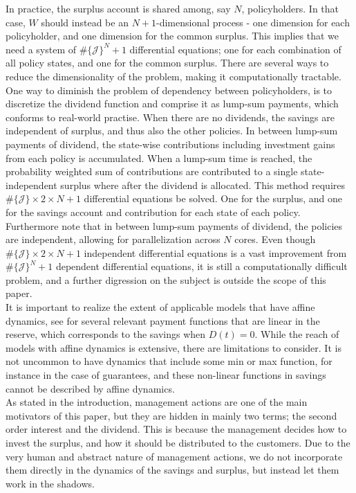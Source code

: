 \documentclass[12pt]{article}
\theoremstyle{my_thm}
\begin{document}
In practice, the surplus account is shared among, say $N$, policyholders. In that case, $W$ should instead be an $N+1$-dimensional process - one dimension for each policyholder, and one dimension for the common surplus. This implies that we need a system of $\# \{ \mathcal{J} \}^N+1$ differential equations; one for each combination of all policy states, and one for the common surplus. There are several ways to reduce the dimensionality of the problem, making it computationally tractable. One way to diminish the problem of dependency between policyholders, is to discretize the dividend function and comprise it as lump-sum payments, which conforms to real-world practise. When there are no dividends, the savings are independent of surplus, and thus also the other policies. In between lump-sum payments of dividend, the state-wise contributions including investment gains from each policy is accumulated. When a lump-sum time is reached, the probability weighted sum of contributions are contributed to a single state-independent surplus where after the dividend is allocated. This method requires $\# \{ \mathcal{J} \} \times 2 \times N + 1$ differential equations be solved. One for the surplus, and one for the savings account and contribution for each state of each policy. Furthermore note that in between lump-sum payments of dividend, the policies are independent, allowing for parallelization across $N$ cores. Even though $\# \{ \mathcal{J} \} \times 2 \times N + 1$ independent differential equations is a vast improvement from $\# \{ \mathcal{J} \}^N + 1$ dependent differential equations, it is still a computationally difficult problem, and a further digression on the subject is outside the scope of this paper.
\\[12pt]
It is important to realize the extent of applicable models that have affine dynamics, see \citet{Christiansen} for several relevant payment functions that are linear in the reserve, which corresponds to the savings when $D(t)=0$. While the reach of models with affine dynamics is extensive, there are limitations to consider. It is not uncommon to have dynamics that include some min or max function, for instance in the case of guarantees, and these non-linear functions in savings cannot be described by affine dynamics. \\
As stated in the introduction, management actions are one of the main motivators of this paper, but they are hidden in mainly two terms; the second order interest and the dividend. This is because the management decides how to invest the surplus, and how it should be distributed to the customers. Due to the very human and abstract nature of management actions, we do not incorporate them directly in the dynamics of the savings and surplus, but instead let them work in the shadows.
\end{document}
